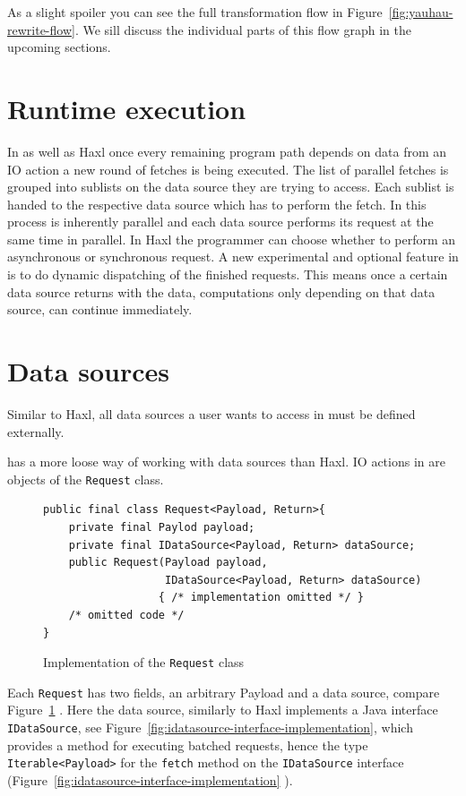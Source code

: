 As a slight spoiler you can see the full \yauhau{} transformation flow in Figure~\ref{fig:yauhau-rewrite-flow}.
We sill discuss the individual parts of this flow graph in the upcoming sections.

\section{Runtime execution}

In \yauhau{} as well as Haxl once every remaining program path depends on data from an IO action a new round of fetches is being executed.
The list of parallel fetches is grouped into sublists on the data source they are trying to access.
Each sublist is handed to the respective data source which has to perform the fetch.
In \yauhau{} this process is inherently parallel and each data source performs its request at the same time in parallel.
In Haxl the programmer can choose whether to perform an asynchronous or synchronous request.
A new experimental and optional feature in \yauhau{} is to do dynamic dispatching of the finished requests.
This means once a certain data source returns with the data, computations only depending on that data source, can continue immediately.

\section{Data sources}

Similar to Haxl, all data sources a user wants to access in \yauhau{} must be defined externally.

\yauhau{} has a more loose way of working with data sources than Haxl.
IO actions in \yauhau{} are objects of the \texttt{Request} class.

\begin{figure}[h]
\begin{verbatim}
public final class Request<Payload, Return>{
    private final Paylod payload;
    private final IDataSource<Payload, Return> dataSource;
    public Request(Payload payload,
                   IDataSource<Payload, Return> dataSource)
                  { /* implementation omitted */ }
    /* omitted code */
}
\end{verbatim}
\caption{Implementation of the \texttt{Request} class}
\label{fig:request-class-implementation}
\end{figure}

Each \texttt{Request} has two fields, an arbitrary Payload and a data source, compare Figure~\ref{fig:request-class-implementation} .
Here the data source, similarly to Haxl implements a Java interface \texttt{IDataSource}, see Figure~\ref{fig:idatasource-interface-implementation}, which provides a method for executing batched requests, hence the type \texttt{Iterable<Payload>} for the \texttt{fetch} method on the \texttt{IDataSource} interface (Figure~\ref{fig:idatasource-interface-implementation}   ).

